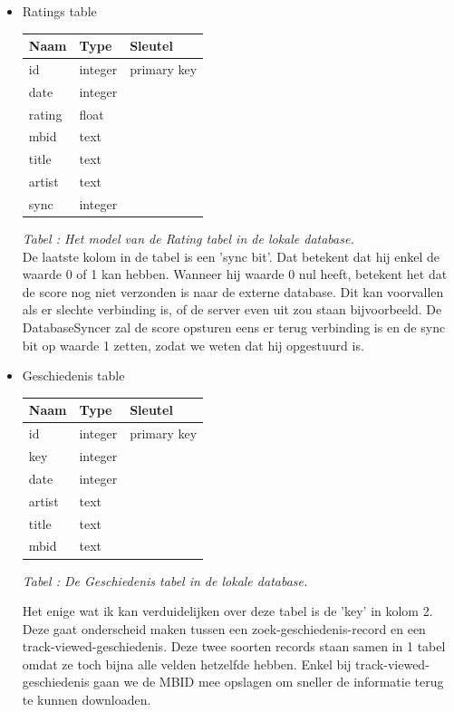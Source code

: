 \documentclass[11pt,a4paper]{article}
\newcounter{tabc}
\newcommand{\tabID} {%
   \stepcounter{tabc}%
   \thetabc}
\begin{document}
	 \begin{itemize}
		\item Ratings table \newline
		\begin{tabular}{| l | l | l | }
		\hline
		 Naam		& Type		& Sleutel		\\
		 \hline 
		id 		& integer 	& primary key 	\\
		date 	& integer	& 				\\
		rating 	& float 	& 				\\
		mbid 	& text 		& 				\\
		title 	& text 		& 				\\
		artist 	& text 		& 				\\
		sync	& integer 	& 				\\
		\hline
		\end{tabular} \newline
		\small \textit{Tabel \tabID : Het model van de Rating tabel in de lokale database.} \\ \normalsize \newline
		De laatste kolom in de tabel is een 'sync bit'. Dat betekent dat hij enkel de waarde 0 of 1 kan hebben. Wanneer hij waarde 0 nul heeft, betekent het dat de score nog niet verzonden is naar de externe database. Dit kan voorvallen als er slechte verbinding is, of de server even uit zou staan bijvoorbeeld.  De DatabaseSyncer zal de score opsturen eens er terug verbinding is en de sync bit op waarde 1 zetten, zodat we weten dat hij opgestuurd is.
		
		\item Geschiedenis table \newline
		\begin{tabular}{| l | l | l | }
		\hline
		 Naam		& Type		& Sleutel		\\
		 \hline
		 id 	& integer 	& primary key 	\\
		 key	& integer	&				\\
		date 	& integer 	& 				\\
		artist 	& text 		& 				\\
		title 	& text 		& 				\\
		mbid 	& text 		& 				\\
		\hline
		\end{tabular} \newline
		\small \textit{Tabel \tabID : De Geschiedenis tabel in de lokale database.} \\ \normalsize
	
		Het enige wat ik kan verduidelijken over deze tabel is de 'key' in kolom 2. Deze gaat onderscheid maken tussen een zoek-geschiedenis-record en een track-viewed-geschiedenis. Deze twee soorten records staan samen in 1 tabel omdat ze toch bijna alle velden hetzelfde hebben. Enkel bij track-viewed-geschiedenis gaan we de MBID mee opslagen om sneller de informatie terug te kunnen downloaden.
	 \end{itemize}
	
\end{document}
